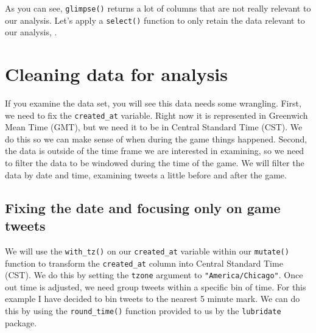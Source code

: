 \documentclass[]{book}
\newenvironment{Shaded}{\begin{snugshade}}{\end{snugshade}}
\newcommand{\KeywordTok}[1]{\textcolor[rgb]{0.13,0.29,0.53}{\textbf{#1}}}
\newcommand{\NormalTok}[1]{#1}
\newcommand{\OperatorTok}[1]{\textcolor[rgb]{0.81,0.36,0.00}{\textbf{#1}}}
\newcommand{\StringTok}[1]{\textcolor[rgb]{0.31,0.60,0.02}{#1}}
\begin{document}
As you can see, \texttt{glimpse()} returns a lot of columns that are not really relevant to our analysis. Let's apply a \texttt{select()} function to only retain the data relevant to our analysis, .

\begin{Shaded}
\end{Shaded}

\hypertarget{cleaning-data-for-analysis}{%
\section{Cleaning data for analysis}\label{cleaning-data-for-analysis}}

If you examine the data set, you will see this data needs some wrangling. First, we need to fix the \texttt{created\_at} variable. Right now it is represented in Greenwich Mean Time (GMT), but we need it to be in Central Standard Time (CST). We do this so we can make sense of when during the game things happened. Second, the data is outside of the time frame we are interested in examining, so we need to filter the data to be windowed during the time of the game. We will filter the data by date and time, examining tweets a little before and after the game.

\hypertarget{fixing-the-date-and-focusing-only-on-game-tweets}{%
\subsection{Fixing the date and focusing only on game tweets}\label{fixing-the-date-and-focusing-only-on-game-tweets}}

We will use the \texttt{with\_tz()} on our \texttt{created\_at} variable within our \texttt{mutate()} function to transform the \texttt{created\_at} column into Central Standard Time (CST). We do this by setting the \texttt{tzone} argument to \texttt{"America/Chicago"}. Once out time is adjusted, we need group tweets within a specific bin of time. For this example I have decided to bin tweets to the nearest 5 minute mark. We can do this by using the \texttt{round\_time()} function provided to us by the \texttt{lubridate} package.
\end{document}
